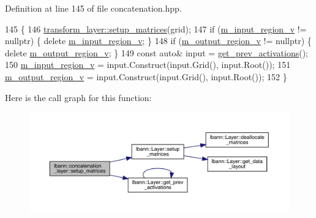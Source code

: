 Definition at line 145 of file concatenation.\+hpp.


\begin{DoxyCode}
145                                                    \{
146     \hyperlink{classlbann_1_1Layer_a57bbe21131dc00ab5cf9ea5e3656808e}{transform\_layer::setup\_matrices}(grid);
147     \textcolor{keywordflow}{if} (\hyperlink{classlbann_1_1concatenation__layer_afa68f2e5d3ea2de57f4974a37c01fc7b}{m\_input\_region\_v} != \textcolor{keyword}{nullptr})  \{ \textcolor{keyword}{delete} \hyperlink{classlbann_1_1concatenation__layer_afa68f2e5d3ea2de57f4974a37c01fc7b}{m\_input\_region\_v}; \}
148     \textcolor{keywordflow}{if} (\hyperlink{classlbann_1_1concatenation__layer_af141bf9cf1569121a65a68e4ae97855c}{m\_output\_region\_v} != \textcolor{keyword}{nullptr}) \{ \textcolor{keyword}{delete} 
      \hyperlink{classlbann_1_1concatenation__layer_af141bf9cf1569121a65a68e4ae97855c}{m\_output\_region\_v}; \}
149     \textcolor{keyword}{const} \textcolor{keyword}{auto}& input = \hyperlink{classlbann_1_1Layer_a45853df73a2e72bfaa774665a0f37ed7}{get\_prev\_activations}();
150     \hyperlink{classlbann_1_1concatenation__layer_afa68f2e5d3ea2de57f4974a37c01fc7b}{m\_input\_region\_v} = input.Construct(input.Grid(), input.Root());
151     \hyperlink{classlbann_1_1concatenation__layer_af141bf9cf1569121a65a68e4ae97855c}{m\_output\_region\_v} = input.Construct(input.Grid(), input.Root());
152   \}
\end{DoxyCode}
Here is the call graph for this function\+:\nopagebreak
\begin{figure}[H]
\begin{center}
\leavevmode
\includegraphics[width=350pt]{classlbann_1_1concatenation__layer_a9c305ea0cbee1b7b6fe822f514c48d42_cgraph}
\end{center}
\end{figure}
\mbox{\label{classlbann_1_1concatenation__layer_a20c1588e7a506bc7b0acb4d63586ece9}} 
